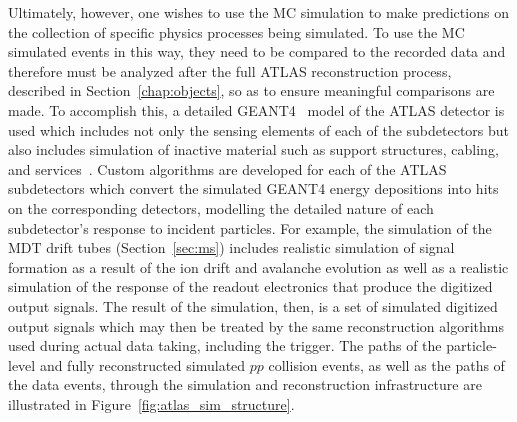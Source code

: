 Ultimately, however, one wishes to use the MC simulation to make predictions on the collection of specific physics
processes being simulated.
To use the MC simulated events in this way, they need to be compared to the recorded data and therefore must be analyzed after
the full ATLAS reconstruction process, described in Section~\ref{chap:objects}, so as to ensure meaningful comparisons are made.
To accomplish this, a detailed \textsc{GEANT4}~\cite{GEANT4} model of the ATLAS detector is used
which includes not only the sensing elements of each of the subdetectors but also includes
simulation of inactive material such as support structures, cabling, and services~\cite{ATLASSim}.
Custom algorithms are developed for each of the ATLAS subdetectors which convert the simulated \textsc{GEANT4}
energy depositions into hits on the corresponding detectors, modelling the detailed nature
of each subdetector's response to incident particles.
For example, the simulation of the MDT drift tubes (Section~\ref{sec:ms}) includes realistic simulation of signal formation as a result of the ion
drift and avalanche evolution as well as a realistic simulation of the response
of the readout electronics that produce the digitized output signals.
The result of the simulation, then, is a set of simulated digitized output signals which
may then be treated by the same reconstruction algorithms used during actual data taking, including the trigger.
The paths of the particle-level and fully reconstructed simulated $pp$ collision events, as well
as the paths of the data events, through the simulation and reconstruction infrastructure are illustrated in Figure~\ref{fig:atlas_sim_structure}.

